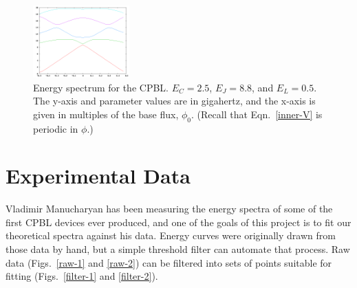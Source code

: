 \documentclass[twocolumn]{revtex4}
\newcommand{\figwidth}{0.33\textwidth}
\begin{document}
\begin{figure} 
\includegraphics[width=\figwidth]{CPBL-theory.png}
\caption{ Energy spectrum for the CPBL. $E_C=2.5$, $E_J=8.8$, and
  $E_L=0.5$. The y-axis and parameter values are in gigahertz, and the
  x-axis is given in multiples of the base flux, $\phi_0$. (Recall
  that Eqn.~\ref{inner-V} is periodic in $\phi$.)}
\label{cpbl-theory}
\end{figure}

\section{Experimental Data}
Vladimir Manucharyan has been measuring the energy spectra of some of the
first CPBL devices ever produced, and one of the goals of this project
is to fit our theoretical spectra against his data. Energy curves were
originally drawn from those data by hand, but a simple threshold
filter can automate that process. Raw data (Figs.~\ref{raw-1} and
\ref{raw-2}) can be filtered into sets of points suitable for fitting
(Figs.~\ref{filter-1} and \ref{filter-2}).
\end{document}
